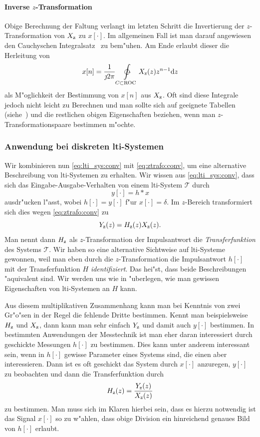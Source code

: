\paragraph{Inverse \texorpdfstring{$z$}{z}-Transformation}
Obige Berechnung der Faltung verlangt im letzten Schritt die Invertierung der $z$-Transformation von $X_{{\rm z}}$ zu $x[\cdot]$.
Im allgemeinen Fall ist man darauf angewiesen den Cauchyschen Integralsatz~ zu bem"uhen.
Am Ende erlaubt dieser die Herleitung von
\begin{equation}\label{eq:ztrafo:inv}
    x[n] = \frac{1}{\jmath 2 \pi} \ointctrclockwise\limits_{C \subset \mathrm{ROC}} X_{\z}(z) z^{n-1} \mathrm{d}z
\end{equation}
als M"oglichkeit der Bestimmung von $x[n]$ aus $X_{{\rm z}}$.
Oft sind diese Integrale jedoch nicht leicht zu Berechnen und man sollte sich auf geeignete Tabellen (siehe~\cite[Tabelle~3.2,~Tabelle~3.3]{proakis2013}) und die restlichen obigen Eigenschaften beziehen, wenn man $z$-Transformationspaare bestimmen m"ochte.
%
%
\subsubsection{Anwendung bei diskreten \texorpdfstring{\acrshort*{lti}}{LTI}-Systemen}
%
Wir kombinieren nun \eqref{eq:lti_sys:conv} mit \eqref{eq:ztrafo:conv}, um eine alternative Beschreibung von \gls{lti}-Systemen zu erhalten.
Wir wissen aus \eqref{eq:lti_sys:conv}, dass sich das Eingabe-Ausgabe-Verhalten von einem \gls{lti}-System $\mathcal{T}$ durch
\[
y[\cdot] = h \ast x
\]
ausdr"ucken l"asst, wobei $h[\cdot] = y[\cdot]$ f"ur $x[\cdot]=\delta$.
Im $z$-Bereich transformiert sich dies wegen \eqref{eq:ztrafo:conv} zu
\begin{equation}\label{eq:ztrafo:transfer_function}
    Y_{\rm z}(z) = H_{\rm z}(z) X_{\rm z}(z).
\end{equation}
Man nennt dann $H_{{\rm z}}$ als $z$-Transformation der Impulsantwort die \emph{Transferfunktion} des Systems $\mathcal{T}$.
Wir haben so eine alternative Sichtweise auf \gls{lti}-Systeme gewonnen, weil man eben durch die $z$-Transformation die Impulsantwort $h[\cdot]$ mit der Transferfunktion $H$ \emph{identifiziert}.
Das hei"st, dass beide Beschreibungen "aquivalent sind.
Wir werden uns wie in  "uberlegen, wie man gewissen Eigenschaften von \gls{lti}-Systemen an $H$  kann.

Aus diesem multiplikativen Zusammenhang kann man bei Kenntnis von zwei Gr"o"sen in der Regel die fehlende Dritte bestimmen.
Kennt man beispielsweise $H_{\rm z}$ und $X_{\rm z}$, dann kann man sehr einfach $Y_{\rm z}$ und damit auch $y[\cdot]$ bestimmen.
In bestimmten Anwendungen der Messtechnik ist man eher daran interessiert durch geschickte Messungen $h[\cdot]$ zu bestimmen.
Dies kann unter anderem interessant sein, wenn in $h[\cdot]$ gewisse Parameter eines Systems  sind, die einen aber interessieren.
Dann ist es oft geschickt das System durch $x[\cdot]$ anzuregen, $y[\cdot]$ zu beobachten und dann die Transferfunktion durch
\[
H_{\rm z}(z) = \frac{Y_{\rm z}(z)}{X_{\rm z}(z)}
\]
zu bestimmen.
Man muss sich im Klaren hierbei sein, dass es hierzu notwendig ist das Signal $x[\cdot]$ so zu w"ahlen, dass obige Division ein hinreichend genaues Bild von $h[\cdot]$ erlaubt.
%
%
